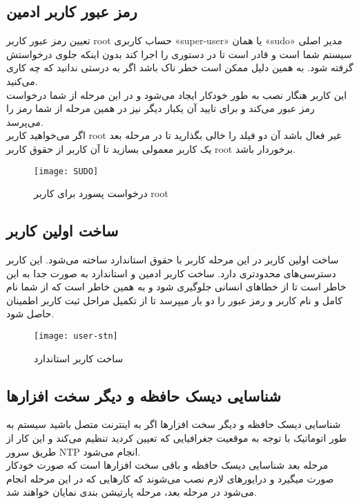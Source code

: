 \subsection{رمز عبور کاربر ادمین }
\begin{frame}{تعیین رمز عبور کاربر root}
  حساب کاربری «super-user» یا همان «sudo» مدیر اصلی سیستم شما است و قادر است تا در دستوری را اجرا کند بدون اینکه جلوی درخواستش گرفته شود. به همین دلیل ممکن است خطر ناک باشد اگر به درستی ندانید که چه کاری می‌کنید.\\
  این کاربر هنگار نصب به طور خودکار ایجاد می‌شود و در این مرحله از شما درخواست رمز عبور می‌کند و برای تایید آن یکبار دیگر نیز در همین مرحله از شما رمز را می‌پرسد.\\
  اگر می‌خواهید کاربر root غیر فعال باشد آن دو فیلد را خالی بگذارید تا در مرحله بعد یک کاربر معمولی بسازید تا آن کاربر از حقوق کاربر root برخوردار باشد.
  \begin{figure}
    \texttt{[image: SUDO]}
    \caption{درخواست پسورد برای کاربر root~\cite{fig:deb_user_root}}
  \end{figure}
\end{frame}
\subsection{ساخت اولین کاربر}
\begin{frame}{ساخت اولین کاربر}
  در این مرحله کاربر با حقوق استاندارد ساخته می‌شود. این کاربر دسترسی‌های محدودتری دارد. ساخت کاربر ادمین و استاندارد به صورت جدا به این خاطر است تا از خطاهای انسانی جلوگیری شود و به همین خاطر است که از شما نام کامل و نام کاربر و رمز عبور را دو بار میپرسد تا از تکمیل مراحل ثبت کاربر اطمینان حاصل شود.
  \begin{figure}
    \texttt{[image: user-stn]}
    \caption{ساخت کاربر استاندارد~\cite{fig:deb_user_stn}}
  \end{figure}
\end{frame}

\subsection{شناسایی دیسک حافظه و دیگر سخت افزارها}
\begin{frame}{شناسایی دیسک حافظه و دیگر سخت افزارها}
  اگر به اینترنت متصل باشید سیستم به طور اتوماتیک با توجه به موقعیت جغرافیایی که تعیین کردید تنظیم می‌کند و این کار از طریق سرور NTP انجام می‌شود.\\
  مرحله بعد شناسایی دیسک حافظه و باقی سخت افزارها است که صورت خودکار صورت میگیرد و درایورهای لازم نصب می‌شوند که کارهایی که در این مرحله انجام می‌شود در مرحله بعد، مرحله پارتیشن بندی نمایان خواهند شد.
\end{frame}

